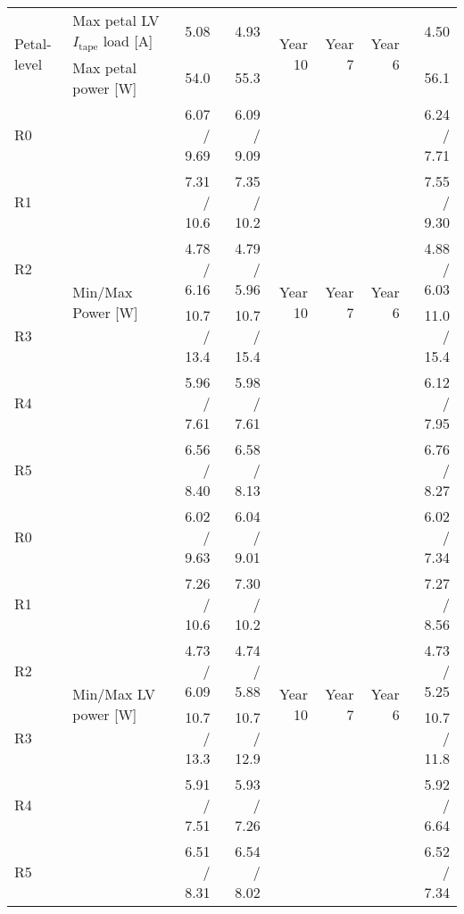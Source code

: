 \begin{table}[hb]
\begin{centering}
{\begin{tabular}{|l|l|r|r|r|r|r|r|}
\multirow{2}{*}{Petal-level}    & Max petal LV $I_\text{tape}$ load [A]        &          5.08 &         4.93 &\multirow{2}{*}{Year 10}&\multirow{2}{*}{Year  7}&\multirow{2}{*}{Year  6}&   4.50 \\ 
                                & Max petal power [W]                          &          54.0 &         55.3 &  & &  &          56.1 \\ \hline
R0                              & \multirow{6}{*}{Min/Max Power [W]}           &   6.07 / 9.69 &  6.09 / 9.09 &\multirow{6}{*}{Year 10}&\multirow{6}{*}{Year  7}&\multirow{6}{*}{Year  6}& 6.24 / 7.71 \\ 
R1                              &                                              &   7.31 / 10.6 &  7.35 / 10.2 &  & &  &   7.55 / 9.30 \\ 
R2                              &                                              &   4.78 / 6.16 &  4.79 / 5.96 &  & &  &   4.88 / 6.03 \\ 
R3                              &                                              &   10.7 / 13.4 &  10.7 / 15.4 &  & &  &   11.0 / 15.4 \\ 
R4                              &                                              &   5.96 / 7.61 &  5.98 / 7.61 &  & &  &   6.12 / 7.95 \\ 
R5                              &                                              &   6.56 / 8.40 &  6.58 / 8.13 &  & &  &   6.76 / 8.27 \\ \hline
R0                              & \multirow{6}{*}{Min/Max LV power [W]}        &   6.02 / 9.63 &  6.04 / 9.01 &\multirow{6}{*}{Year 10}&\multirow{6}{*}{Year  7}&\multirow{6}{*}{Year  6}&   6.02 / 7.34 \\ 
R1                              &                                              &   7.26 / 10.6 &  7.30 / 10.2 &  & &  &   7.27 / 8.56 \\ 
R2                              &                                              &   4.73 / 6.09 &  4.74 / 5.88 &  & &  &   4.73 / 5.25 \\ 
R3                              &                                              &   10.7 / 13.3 &  10.7 / 12.9 &  & &  &   10.7 / 11.8 \\ 
R4                              &                                              &   5.91 / 7.51 &  5.93 / 7.26 &  & &  &   5.92 / 6.64 \\ 
R5                              &                                              &   6.51 / 8.31 &  6.54 / 8.02 &  & &  &   6.52 / 7.34 \\ \hline

\end{tabular}}
\end{centering}
\end{table}
